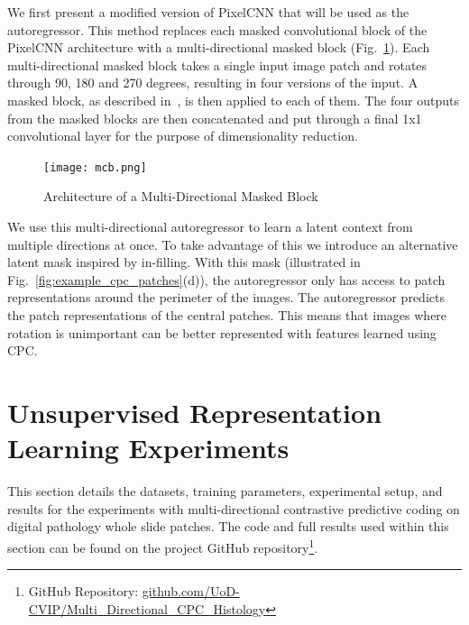 We first present a modified version of PixelCNN that will be used as the autoregressor. This method replaces each masked convolutional block of the PixelCNN architecture with a multi-directional masked block (Fig.~\ref{fig:multi-directional_masked_block}). Each multi-directional masked block takes a single input image patch and rotates through 90, 180 and 270 degrees, resulting in four versions of the input. A masked block, as described in~\cite{oord2016pixel}, is then applied to each of them. The four outputs from the masked blocks are then concatenated and put through a final 1x1 convolutional layer for the purpose of dimensionality reduction.   

\begin{figure}
	\begin{minipage}[b]{1.0\linewidth}
		\centering
		\centerline{\texttt{[image: mcb.png]}}
	\end{minipage}
	\caption{Architecture of a Multi-Directional Masked Block}
	\label{fig:multi-directional_masked_block}
\end{figure}

We use this multi-directional autoregressor to learn a latent context from multiple directions at once. To take advantage of this we introduce an alternative latent mask inspired by in-filling. With this mask (illustrated in Fig.~\ref{fig:example_cpc_patches}(d)), the autoregressor only has access to patch representations around the perimeter of the images. The autoregressor predicts the patch representations of the central patches. This means that images where rotation is unimportant can be better represented with features learned using CPC.



\section{Unsupervised Representation Learning Experiments}
\label{sec:unsupervised_experiments}
This section details the datasets, training parameters, experimental setup, and results for the experiments with multi-directional contrastive predictive coding on digital pathology whole slide patches. The code and full results used within this section can be found on the project GitHub repository\footnote{GitHub Repository: \url{github.com/UoD-CVIP/Multi_Directional_CPC_Histology}}.

